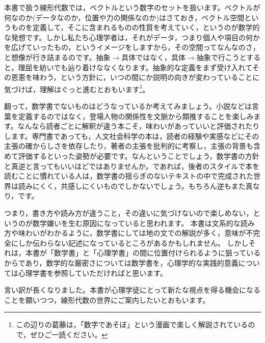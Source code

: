 本書で扱う線形代数では，ベクトルという数字のセットを扱います。ベクトルが何なのか(データなのか，位置や力の関係なのか)はさておき，ベクトル空間というものを定義して，そこに含まれるものの性質を考えていく，というのが数学的な発想です。しかし私たち心理学者は，それがデータ，つまり個人や項目の何かを広げていったもの，というイメージをしますから，その空間ってなんなのさ，と想像が行き詰まるのです。抽象$\to$具体ではなく，具体$\to$抽象で行こうとすると，理屈を紡いでも辿り着けななくなります。抽象的な定義をまず受け入れてその恩恵を味わう，という方針に，いつの間にか説明の向きが変わっていることに気づけば，理解はぐっと進むとおもいます\footnote{この辺りの葛藤は，「数字であそぼ」という漫画\parencite{ASOBO2}で楽しく解説されているので，ぜひご一読ください。}。

翻って，数学書でないものはどうなっているか考えてみましょう。小説などは言葉を定義するのではなく，登場人物の関係性を文脈から類推することを楽しみます。なんなら読者ごとに解釈が違う本こそ，味わいがあっていいと評価されたりします。専門書であっても，人文社会科学の本は，読者の経験や実感などにその主張の確からしさを依存したり，著者の主張を批判的に考察し，主張の背景も含めて評価するといった姿勢が必要です。なんということでしょう，数学書の方針と真逆と言ってもいいほどではありませんか。であれば，後者のスタイルで本を読むことに慣れている人は，数学書の揺らぎのないテキストの中で完成された世界は読みにくく，共感しにくいものでしかないでしょう。もちろん逆もまた真なり，です。

つまり，書き方や読み方が違うこと，その違いに気づけないので楽しめない，というのが数学嫌いを生む原因になっていると思われます。
本書は文系的な読み方や味わいがわかるように，数学書にしては地の文での解説が多く，意味が不完全にしか伝わらない記述になっているところがあるかもしれません。
しかしそれは，本書が「数学書」と「心理学書」の間に位置付けられるように狙っているからであり，数学的な厳密さについては数学書を，心理学的な実践的意義については心理学書を参照していただければと思います。

\vspace{2cm}
言い訳が長くなりました。本書が心理学徒にとって新たな視点を得る機会になることを願いつつ，線形代数の世界にご案内したいとおもいます。